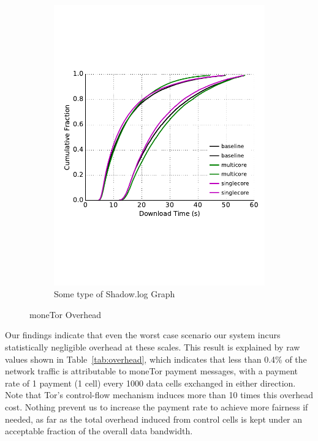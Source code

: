 \begin{figure}
\begin{subfigure}[t]{0.32\textwidth}
\includegraphics[trim={0 3cm 0 3cm}, clip, width=1.0\textwidth]{images/overhead_downloadtime.pdf}
		\caption{Some type of Shadow.log Graph}
		\label{fig:stats_c}
	\end{subfigure}
	\caption{moneTor Overhead}
	\label{fig:overhead}
\end{figure}

Our findings indicate that even the worst case scenario our system incurs
statistically negligible overhead at these scales. This result is explained by
raw values shown in Table~\ref{tab:overhead}, which indicates that less than
0.4\% of the network traffic is attributable to moneTor payment messages, with a payment rate of 1 payment (1 cell) every 1000 data cells exchanged in either direction. Note that Tor's control-flow mechanism induces more than 10 times this overhead cost. Nothing prevent us to increase the payment rate to achieve more fairness if needed, as far as the total overhead induced from control cells is kept under an acceptable fraction of the overall data bandwidth.

